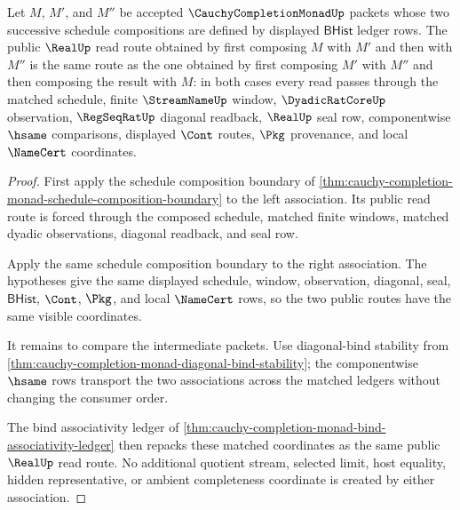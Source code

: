 \begin{theorem}
\label{thm:cauchy-completion-monad-bind-associativity-boundary}
Let $M$, $M'$, and $M''$ be accepted $\CauchyCompletionMonadUp$ packets whose two successive schedule compositions are defined by displayed $\mathsf{BHist}$ ledger rows. The public $\RealUp$ read route obtained by first composing $M$ with $M'$ and then with $M''$ is the same route as the one obtained by first composing $M'$ with $M''$ and then composing the result with $M$: in both cases every read passes through the matched schedule, finite $\StreamNameUp$ window, $\DyadicRatCoreUp$ observation, $\RegSeqRatUp$ diagonal readback, $\RealUp$ seal row, componentwise $\hsame$ comparisons, displayed $\Cont$ routes, $\Pkg$ provenance, and local $\NameCert$ coordinates.
\end{theorem}
\begin{proof}
First apply the schedule composition boundary of \autoref{thm:cauchy-completion-monad-schedule-composition-boundary} to the left association. Its public read route is forced through the composed schedule, matched finite windows, matched dyadic observations, diagonal readback, and seal row.

Apply the same schedule composition boundary to the right association. The hypotheses give the same displayed schedule, window, observation, diagonal, seal, $\mathsf{BHist}$, $\Cont$, $\Pkg$, and local $\NameCert$ rows, so the two public routes have the same visible coordinates.

It remains to compare the intermediate packets. Use diagonal-bind stability from \autoref{thm:cauchy-completion-monad-diagonal-bind-stability}; the componentwise $\hsame$ rows transport the two associations across the matched ledgers without changing the consumer order.

The bind associativity ledger of \autoref{thm:cauchy-completion-monad-bind-associativity-ledger} then repacks these matched coordinates as the same public $\RealUp$ read route. No additional quotient stream, selected limit, host equality, hidden representative, or ambient completeness coordinate is created by either association.
\end{proof}

